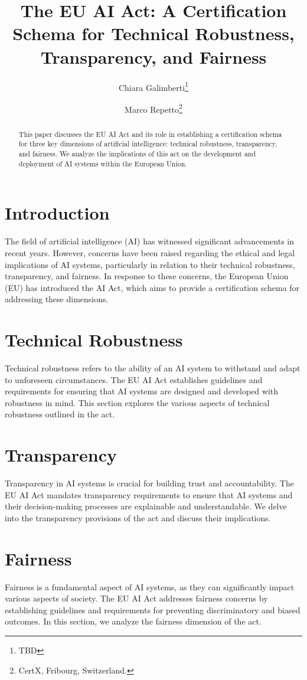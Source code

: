 \documentclass{article}
\title{The EU AI Act: A Certification Schema for Technical Robustness, Transparency, and Fairness}
\author{Chiara Galimberti\thanks{TBD} \and Marco Repetto\thanks{CertX, Fribourg, Switzerland.}}
\begin{document}
	
\maketitle


\begin{abstract}

This paper discusses the EU AI Act and its role in establishing a certification schema for three key dimensions of artificial intelligence: technical robustness, transparency, and fairness. We analyze the implications of this act on the development and deployment of AI systems within the European Union.

\end{abstract}


\section{Introduction}

The field of artificial intelligence (AI) has witnessed significant advancements in recent years. However, concerns have been raised regarding the ethical and legal implications of AI systems, particularly in relation to their technical robustness, transparency, and fairness. In response to these concerns, the European Union (EU) has introduced the AI Act, which aims to provide a certification schema for addressing these dimensions.


\section{Technical Robustness}

Technical robustness refers to the ability of an AI system to withstand and adapt to unforeseen circumstances. The EU AI Act establishes guidelines and requirements for ensuring that AI systems are designed and developed with robustness in mind. This section explores the various aspects of technical robustness outlined in the act.


\section{Transparency}

Transparency in AI systems is crucial for building trust and accountability. The EU AI Act mandates transparency requirements to ensure that AI systems and their decision-making processes are explainable and understandable. We delve into the transparency provisions of the act and discuss their implications.


\section{Fairness}

Fairness is a fundamental aspect of AI systems, as they can significantly impact various aspects of society. The EU AI Act addresses fairness concerns by establishing guidelines and requirements for preventing discriminatory and biased outcomes. In this section, we analyze the fairness dimension of the act.
\end{document}
